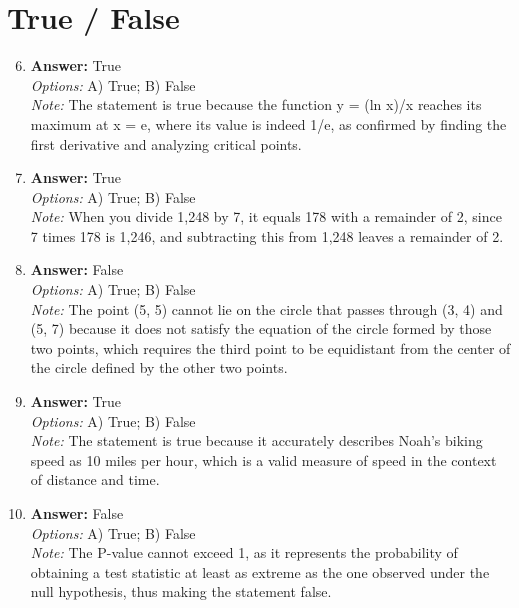 \documentclass[12pt]{article}
\begin{document}
\section*{True / False}
\begin{enumerate}[label=\arabic*.]
\setcounter{enumi}{5}
\item \textbf{Answer:} True
\\ \textit{Options:} A) True; B) False
\\ \textit{Note:} The statement is true because the function y = (ln x)/x reaches its maximum at x = e, where its value is indeed 1/e, as confirmed by finding the first derivative and analyzing critical points.
\item \textbf{Answer:} True
\\ \textit{Options:} A) True; B) False
\\ \textit{Note:} When you divide 1,248 by 7, it equals 178 with a remainder of 2, since 7 times 178 is 1,246, and subtracting this from 1,248 leaves a remainder of 2.
\item \textbf{Answer:} False
\\ \textit{Options:} A) True; B) False
\\ \textit{Note:} The point (5, 5) cannot lie on the circle that passes through (3, 4) and (5, 7) because it does not satisfy the equation of the circle formed by those two points, which requires the third point to be equidistant from the center of the circle defined by the other two points.
\item \textbf{Answer:} True
\\ \textit{Options:} A) True; B) False
\\ \textit{Note:} The statement is true because it accurately describes Noah's biking speed as 10 miles per hour, which is a valid measure of speed in the context of distance and time.
\item \textbf{Answer:} False
\\ \textit{Options:} A) True; B) False
\\ \textit{Note:} The P-value cannot exceed 1, as it represents the probability of obtaining a test statistic at least as extreme as the one observed under the null hypothesis, thus making the statement false.
\end{enumerate}
\end{document}
